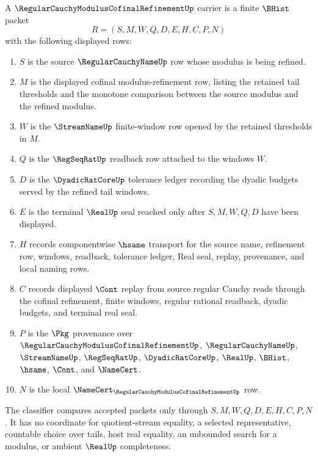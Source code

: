 \begin{definition}
\label{def:regular-cauchy-modulus-cofinal-refinement-carrier}
A $\RegularCauchyModulusCofinalRefinementUp$ carrier is a finite $\BHist$ packet
$$
R=(S,M,W,Q,D,E,H,C,P,N)
$$
with the following displayed rows:
\begin{enumerate}
\item $S$ is the source $\RegularCauchyNameUp$ row whose modulus is being refined.
\item $M$ is the displayed cofinal modulus-refinement row, listing the retained tail thresholds and the monotone comparison between the source modulus and the refined modulus.
\item $W$ is the $\StreamNameUp$ finite-window row opened by the retained thresholds in $M$.
\item $Q$ is the $\RegSeqRatUp$ readback row attached to the windows $W$.
\item $D$ is the $\DyadicRatCoreUp$ tolerance ledger recording the dyadic budgets served by the refined tail windows.
\item $E$ is the terminal $\RealUp$ seal reached only after $S,M,W,Q,D$ have been displayed.
\item $H$ records componentwise $\hsame$ transport for the source name, refinement row, windows, readback, tolerance ledger, Real seal, replay, provenance, and local naming rows.
\item $C$ records displayed $\Cont$ replay from source regular Cauchy reads through the cofinal refinement, finite windows, regular rational readback, dyadic budgets, and terminal real seal.
\item $P$ is the $\Pkg$ provenance over $\RegularCauchyModulusCofinalRefinementUp$, $\RegularCauchyNameUp$, $\StreamNameUp$, $\RegSeqRatUp$, $\DyadicRatCoreUp$, $\RealUp$, $\BHist$, $\hsame$, $\Cont$, and $\NameCert$.
\item $N$ is the local $\NameCert_{\RegularCauchyModulusCofinalRefinementUp}$ row.
\end{enumerate}
The classifier compares accepted packets only through $S,M,W,Q,D,E,H,C,P,N$. It has no coordinate for quotient-stream equality, a selected representative, countable choice over tails, host real equality, an unbounded search for a modulus, or ambient $\RealUp$ completeness.
\end{definition}


